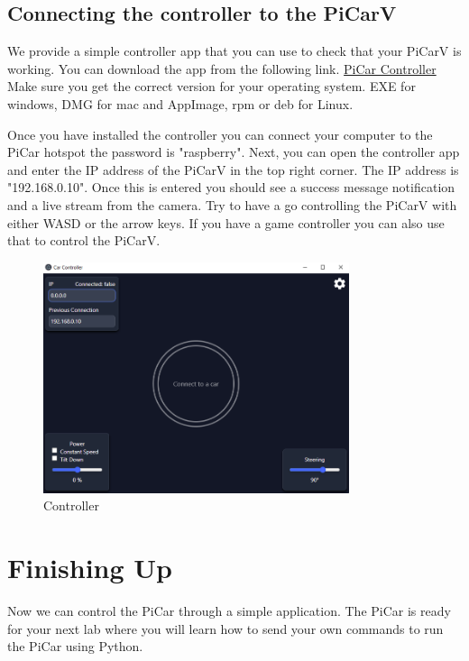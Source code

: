 \documentclass[11pt]{report}
\begin{document}

\section{Connecting the controller to the PiCarV}
We provide a simple controller app that you can use to check that your PiCarV is working. You can download the app from the following link. 
\href{https://github.com/PiCarV/Controller/releases/latest}{PiCar Controller} Make sure you get the correct version for your operating system. EXE for windows, DMG for mac and AppImage, rpm or deb for Linux.


Once you have installed the controller you can connect your computer to the PiCar hotspot the password is "raspberry". Next, you can open the controller app and enter the IP address of the PiCarV in the top right corner. The IP address is "192.168.0.10". Once this is entered you should see a success message notification and a live stream from the camera. Try to have a go controlling the PiCarV with either WASD or the arrow keys. If you have a game controller you can also use that to control the PiCarV.


\begin{figure}[h]
    \centering
    \includegraphics[width=0.8\textwidth]{controller.png}
    \caption{Controller}
    \label{fig:Controller}
\end{figure}


\chapter{Finishing Up}
Now we can control the PiCar through a simple application. The PiCar is ready for your next lab where you will learn how to send your own commands to run the PiCar using Python.
\end{document}
